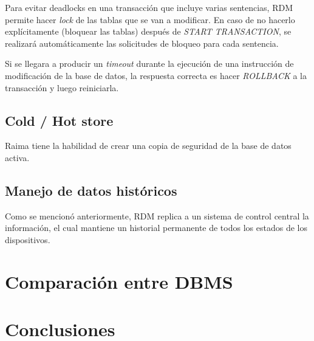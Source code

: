 \documentclass{acmart}
\begin{document}
Para evitar \textbf{}{deadlocks} en una transacción que incluye varias sentencias, RDM permite hacer \textit{lock} de las tablas que se van a modificar. En caso de no hacerlo explícitamente (bloquear las tablas) después de \textit{START TRANSACTION}, se realizará automáticamente las solicitudes de bloqueo para cada sentencia. 

Si se llegara a producir un \textit{timeout} durante la ejecución de una instrucción de modificación de la base de datos, la respuesta correcta es hacer \textit{ROLLBACK}
a la transacción y luego reiniciarla. \cite{Rtrans}
\subsection{Cold / Hot store}
Raima tiene la habilidad de crear una copia de seguridad de la base de datos activa. \cite{Rserv}
\subsection{Manejo de datos históricos}
Como se mencionó anteriormente, RDM replica a un sistema de control central la información, el cual mantiene un historial permanente de todos los estados de los dispositivos. \cite{Rwiki}

\newpage

\section{Comparación entre DBMS}

\section{Conclusiones}
\end{document}
